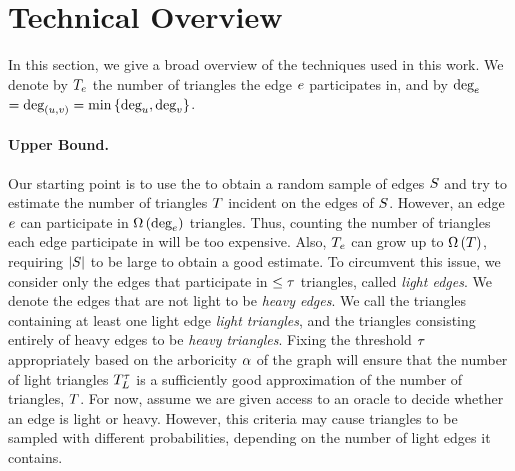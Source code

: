 \section{Technical Overview}
\label{sec:tech-overview}
In this section, we give a broad overview of the techniques used in this work. We denote by $T_e$ the number of triangles the edge $e$ participates in, and by $\mbox{deg}_{e}$  $=\mbox{deg}_{\left({u,v}\right)} = \min{\left\{{\mbox{deg}_{u},\mbox{deg}_{v}}\right\}}$.

\paragraph*{Upper Bound.} Our starting point is to use the \randedgeq{} to obtain a random sample of edges $S$ and try to estimate the number of triangles $T$ incident on the edges of $S$. However, an edge $e$ can participate in $\Omega\left({{\mbox{deg}_{e}}}\right)$ triangles. Thus, counting the number of triangles each edge participate in will be too expensive.  Also, $T_e$ can grow up to $\Omega\left({{T}}\right)$, requiring $\left|{S}\right|$ to be large to obtain a good estimate. To circumvent this issue, we consider only the edges that participate in $\leq \tau$ triangles, called \emph{light edges}. We denote the edges that are not light to be \emph{heavy edges}. We call the triangles containing at least one light edge \emph{light triangles}, and the triangles consisting entirely of heavy edges to be \emph{heavy triangles}. Fixing the threshold $\tau$ appropriately based on the arboricity $\alpha$ of the graph will ensure that the number of light triangles $T^{\tau}_{L}$ is a sufficiently good approximation of the number of triangles, $T$. For now, assume we are given access to an oracle \heavyoracle{} to decide whether an edge is light or heavy. However, this criteria may cause triangles to be sampled with different probabilities, depending on the number of light edges it contains. 


